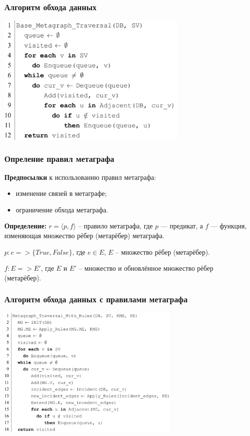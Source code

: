 \documentclass[pdf, hyperref={unicode}, aspectratio=169]{beamer}
\begin{document}
\begin{frame}
\frametitle{Алгоритм обхода данных}

	\begin{center}
		\includegraphics[height = 6.5cm]{img/algorithm-base}
	\end{center}
\end{frame}


\begin{frame}
\frametitle{Опреление правил метаграфа}
	\textbf{Предпосылки} к использованию правил метаграфа:
	\begin{itemize}
		\item изменение связей в метаграфе;
		\item ограничение обхода метаграфа.
	\end{itemize}

	\textbf{Определение:} $r = \langle p, f \rangle$ -- правило метаграфа, где $p$ — предикат, а $f$ — функция, изменяющая множество рёбер (метарёбер) метаграфа.

	$p: e => \{True, False\}$, где $e \in E$, $E$ -- множество рёбер (метарёбер).

	$f: E => E'$, где $E$ и $E'$ -- множество и обновлённое множество рёбер (метарёбер).
\end{frame}


\begin{frame}
\frametitle{Алгоритм обхода данных с правилами метаграфа}
	\begin{center}
		\includegraphics[height = 6.5cm]{img/algorithm-with-rules}
	\end{center}
\end{frame}
\end{document}
